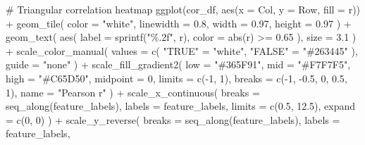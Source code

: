 \documentclass[
  letterpaper,
  DIV=11,
  numbers=noendperiod]{scrreprt}
\newenvironment{Shaded}{\begin{snugshade}}{\end{snugshade}}
\newcommand{\AttributeTok}[1]{\textcolor[rgb]{0.40,0.45,0.13}{#1}}
\newcommand{\CommentTok}[1]{\textcolor[rgb]{0.37,0.37,0.37}{#1}}
\newcommand{\DecValTok}[1]{\textcolor[rgb]{0.68,0.00,0.00}{#1}}
\newcommand{\FloatTok}[1]{\textcolor[rgb]{0.68,0.00,0.00}{#1}}
\newcommand{\FunctionTok}[1]{\textcolor[rgb]{0.28,0.35,0.67}{#1}}
\newcommand{\NormalTok}[1]{\textcolor[rgb]{0.00,0.23,0.31}{#1}}
\newcommand{\OtherTok}[1]{\textcolor[rgb]{0.00,0.23,0.31}{#1}}
\newcommand{\SpecialCharTok}[1]{\textcolor[rgb]{0.37,0.37,0.37}{#1}}
\newcommand{\StringTok}[1]{\textcolor[rgb]{0.13,0.47,0.30}{#1}}
\newcounter{none} %
\begin{document}
\begin{Shaded}
\begin{Highlighting}[]
\CommentTok{\# Triangular correlation heatmap}
\FunctionTok{ggplot}\NormalTok{(cor\_df, }\FunctionTok{aes}\NormalTok{(}\AttributeTok{x =}\NormalTok{ Col, }\AttributeTok{y =}\NormalTok{ Row, }\AttributeTok{fill =}\NormalTok{ r)) }\SpecialCharTok{+}
  \FunctionTok{geom\_tile}\NormalTok{(}
    \AttributeTok{color =} \StringTok{"white"}\NormalTok{,}
    \AttributeTok{linewidth =} \FloatTok{0.8}\NormalTok{,}
    \AttributeTok{width =} \FloatTok{0.97}\NormalTok{,}
    \AttributeTok{height =} \FloatTok{0.97}
\NormalTok{  ) }\SpecialCharTok{+}
  \FunctionTok{geom\_text}\NormalTok{(}
    \FunctionTok{aes}\NormalTok{(}
      \AttributeTok{label =} \FunctionTok{sprintf}\NormalTok{(}\StringTok{"\%.2f"}\NormalTok{, r),}
      \AttributeTok{color =} \FunctionTok{abs}\NormalTok{(r) }\SpecialCharTok{\textgreater{}=} \FloatTok{0.65}
\NormalTok{    ),}
    \AttributeTok{size =} \FloatTok{3.1}
\NormalTok{  ) }\SpecialCharTok{+}
  \FunctionTok{scale\_color\_manual}\NormalTok{(}
    \AttributeTok{values =} \FunctionTok{c}\NormalTok{(}
      \StringTok{"TRUE"} \OtherTok{=} \StringTok{"white"}\NormalTok{,}
      \StringTok{"FALSE"} \OtherTok{=} \StringTok{"\#263445"}
\NormalTok{    ),}
    \AttributeTok{guide =} \StringTok{"none"}
\NormalTok{  ) }\SpecialCharTok{+}
  \FunctionTok{scale\_fill\_gradient2}\NormalTok{(}
    \AttributeTok{low =} \StringTok{"\#365F91"}\NormalTok{,}
    \AttributeTok{mid =} \StringTok{"\#F7F7F5"}\NormalTok{,}
    \AttributeTok{high =} \StringTok{"\#C65D50"}\NormalTok{,}
    \AttributeTok{midpoint =} \DecValTok{0}\NormalTok{,}
    \AttributeTok{limits =} \FunctionTok{c}\NormalTok{(}\SpecialCharTok{{-}}\DecValTok{1}\NormalTok{, }\DecValTok{1}\NormalTok{),}
    \AttributeTok{breaks =} \FunctionTok{c}\NormalTok{(}\SpecialCharTok{{-}}\DecValTok{1}\NormalTok{, }\SpecialCharTok{{-}}\FloatTok{0.5}\NormalTok{, }\DecValTok{0}\NormalTok{, }\FloatTok{0.5}\NormalTok{, }\DecValTok{1}\NormalTok{),}
    \AttributeTok{name =} \StringTok{"Pearson r"}
\NormalTok{  ) }\SpecialCharTok{+}
  \FunctionTok{scale\_x\_continuous}\NormalTok{(}
    \AttributeTok{breaks =} \FunctionTok{seq\_along}\NormalTok{(feature\_labels),}
    \AttributeTok{labels =}\NormalTok{ feature\_labels,}
    \AttributeTok{limits =} \FunctionTok{c}\NormalTok{(}\FloatTok{0.5}\NormalTok{, }\FloatTok{12.5}\NormalTok{),}
    \AttributeTok{expand =} \FunctionTok{c}\NormalTok{(}\DecValTok{0}\NormalTok{, }\DecValTok{0}\NormalTok{)}
\NormalTok{  ) }\SpecialCharTok{+}
  \FunctionTok{scale\_y\_reverse}\NormalTok{(}
    \AttributeTok{breaks =} \FunctionTok{seq\_along}\NormalTok{(feature\_labels),}
    \AttributeTok{labels =}\NormalTok{ feature\_labels,}

\end{Highlighting}
\end{Shaded}
\end{document}
